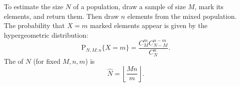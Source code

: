 To estimate the size $N$ of a population, draw a sample of size $M$, mark its elements, and return them. Then draw $n$ elements from the mixed population. The probability that $X = m$ marked elements appear is given by the hypergeometric distribution:
$$\text{P}_{N,M;n}\{X = m\} = \frac{C_M^{m} C_{N-M}^{n-m}}{C_N^n}.$$
The  of $N$ (for fixed $M, n, m$) is
$$\hat{N} = \left\lfloor \frac{Mn}{m} \right\rfloor.$$
